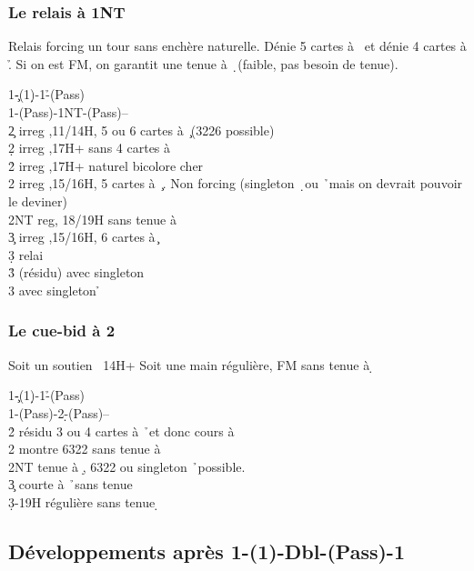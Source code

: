 \documentclass[a4paper]{article}
\begin{document}
\subsubsection{Le relais à 1NT}

Relais forcing un tour sans enchère naturelle. Dénie 5 cartes à \s\ et dénie 4 cartes à \h . 
Si on est FM, on garantit une tenue à \d\ (faible, pas besoin de tenue).

\begin{bidtable}
1\c-(1\d)-1\h-(Pass)\\
1\s-(Pass)-1NT-(Pass)--\\
2\c \> irreg ,11/14H, 5 ou 6 cartes à \c\ (3226 possible)\\
2\d \> irreg ,17H+ sans 4 cartes à \h \\
2\h \> irreg ,17H+ naturel bicolore cher\\
2\s \> irreg ,15/16H, 5 cartes à \c\ . Non forcing (singleton \d\ ou \h\ mais on devrait pouvoir le deviner)\\
2NT \> reg, 18/19H sans tenue à \d \\
3\c \> irreg ,15/16H, 6 cartes à \c \+\\
3\d \> relai\+\\
3\h \> (résidu) avec singleton \d \\
3\s \> avec singleton \h \-\-
\end{bidtable}

\subsubsection{Le cue-bid à 2 \pdfd}

Soit un soutien \s\ 14H+
Soit une main régulière, FM sans tenue à \d 

\begin{bidtable}
1\c-(1\d)-1\h-(Pass)\\
1\s-(Pass)-2\d-(Pass)--\\
2\h \> résidu 3 ou 4 cartes à \h\ et donc cours à \d \\
2\s \> montre 6322 sans tenue à \d \\
2NT \> tenue à \d , 6322 ou singleton \h\ possible.\\
3\c \> courte à \h\ sans tenue \d \\
3\d {}-19H régulière sans tenue \d 
\end{bidtable}

\subsection{Développements après 1\pdfc-(1\pdfh)-Dbl-(Pass)-1\pdfs}
\end{document}

